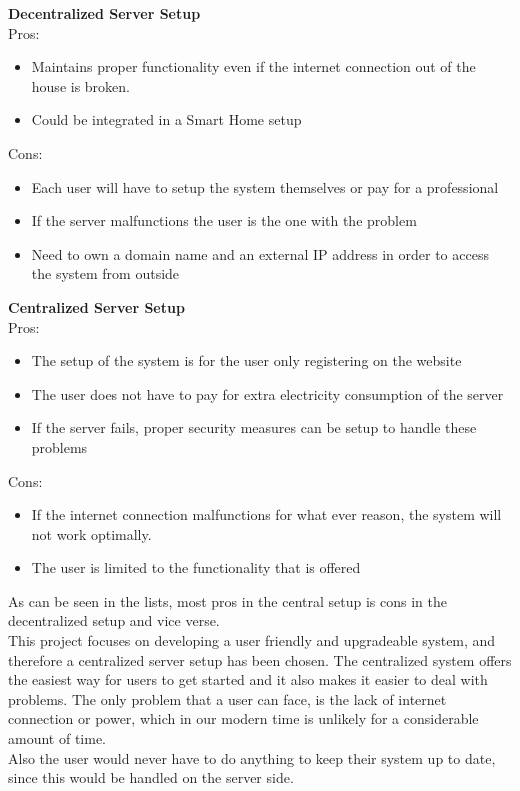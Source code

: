 \textbf{Decentralized Server Setup}\\
Pros:
\begin{itemize}
	\item Maintains proper functionality even if the internet connection out of the house is broken.
	\item Could be integrated in a Smart Home setup
\end{itemize}

Cons:
\begin{itemize}
	\item Each user will have to setup the system themselves or pay for a professional
  \item If the server malfunctions the user is the one with the problem
  \item Need to own a domain name and an external IP address in order to access the system from outside
\end{itemize}

\textbf{Centralized Server Setup}\\
Pros:
\begin{itemize}
	\item The setup of the system is for the user only registering on the website
	\item The user does not have to pay for extra electricity consumption of the server
	\item If the server fails, proper security measures can be setup to handle these problems
\end{itemize}

Cons:
\begin{itemize}
	\item If the internet connection malfunctions for what ever reason, the system will not work optimally.
  \item The user is limited to the functionality that is offered
\end{itemize}

As can be seen in the lists, most pros in the central setup is cons in the decentralized setup and vice verse.\\
This project focuses on developing a user friendly and upgradeable system, and therefore a centralized server setup has been chosen. The centralized system offers the easiest way for users to get started and it also makes it easier to deal with problems. The only problem that a user can face, is the lack of internet connection or power, which in our modern time is unlikely for a considerable amount of time.\\
Also the user would never have to do anything to keep their system up to date, since this would be handled on the server side.
